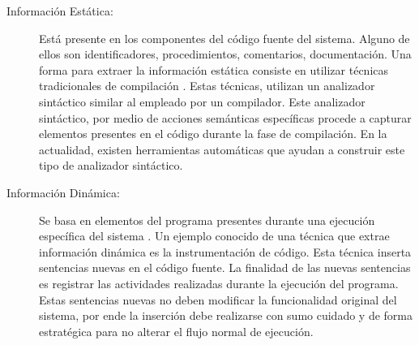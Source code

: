 \begin{description}
\item[Información Estática:] Está presente en los componentes del código fuente del sistema. Alguno de ellos son identificadores, procedimientos, comentarios, documentación.
Una forma para extraer la información estática consiste en utilizar técnicas tradicionales de compilación \cite{AHUL06}. Estas 
técnicas, utilizan un analizador sintáctico similar al empleado por un compilador. Este analizador sintáctico, por medio de acciones semánticas específicas procede a capturar elementos presentes en el código durante la fase de compilación. En la actualidad, existen herramientas automáticas que ayudan a construir este tipo de analizador sintáctico.




\item[Información Dinámica:] Se basa en elementos del programa presentes durante una ejecución específica del sistema \cite{THBE99}. Un ejemplo conocido de una técnica que extrae información dinámica es la instrumentación de código. Esta técnica inserta sentencias nuevas en el código fuente. La finalidad de las nuevas sentencias es registrar las actividades realizadas durante la ejecución del programa. 
Estas sentencias nuevas no deben modificar la funcionalidad original del sistema, por ende la inserción debe realizarse con sumo cuidado y de forma estratégica para no alterar el flujo normal de ejecución.


\end{description}
